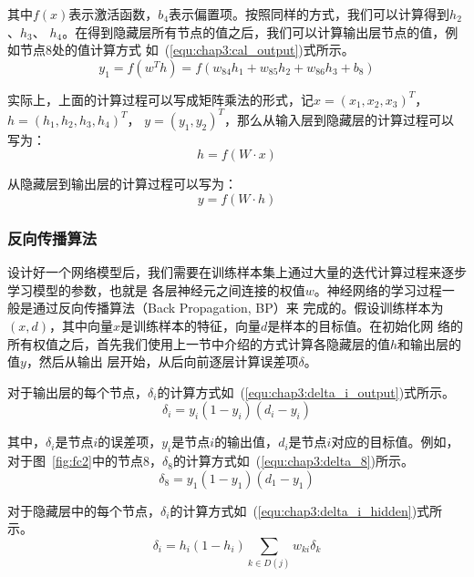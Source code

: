其中$f(x)$表示激活函数，$b_4$表示偏置项。按照同样的方式，我们可以计算得到$h_2$、$h_3$、
$h_4$。在得到隐藏层所有节点的值之后，我们可以计算输出层节点的值，例如节点8处的值计算方式
如~(\ref{equ:chap3:cal_output})式所示。
\begin{equation}
  \label{equ:chap3:cal_output}
  y_1 = f(w^Th)=f(w_{84}h_1+w_{85}h_2+w_{86}h_3+b_8)
\end{equation}

实际上，上面的计算过程可以写成矩阵乘法的形式，记$x=(x_1,x_2,x_3)^T$，$h=(h_1,h_2,h_3,h_4)^T$，
$y=(y_1,y_2)^T$，那么从输入层到隐藏层的计算过程可以写为：
\begin{equation}
  \label{equ:chap3:matrix_cal_hidden}
  h = f(W\cdot x)
\end{equation}

从隐藏层到输出层的计算过程可以写为：
\begin{equation}
  \label{equ:chap3:matrix_cal_output}
  y = f(W\cdot h)
\end{equation}

\subsubsection{反向传播算法}

设计好一个网络模型后，我们需要在训练样本集上通过大量的迭代计算过程来逐步学习模型的参数，也就是
各层神经元之间连接的权值$w$。神经网络的学习过程一般是通过反向传播算法（Back Propagation, BP）来
完成的。假设训练样本为$(x, d)$，其中向量$x$是训练样本的特征，向量$d$是样本的目标值。在初始化网
络的所有权值之后，首先我们使用上一节中介绍的方式计算各隐藏层的值$h$和输出层的值$y$，然后从输出
层开始，从后向前逐层计算误差项$\delta$。

对于输出层的每个节点，$\delta_i$的计算方式如~(\ref{equ:chap3:delta_i_output})式所示。
\begin{equation}
  \label{equ:chap3:delta_i_output}
  \delta_i = y_i(1-y_i)(d_i-y_i)
\end{equation}

其中，$\delta_i$是节点$i$的误差项，$y_i$是节点$i$的输出值，$d_i$是节点$i$对应的目标值。例如，
对于图~\ref{fig:fc2}中的节点8，$\delta_8$的计算方式如~(\ref{equ:chap3:delta_8})所示。
\begin{equation}
  \label{equ:chap3:delta_8}
  \delta_8 = y_1(1-y_1)(d_1-y_1)
\end{equation}

对于隐藏层中的每个节点，$\delta_i$的计算方式如~(\ref{equ:chap3:delta_i_hidden})式所示。
\begin{equation}
  \label{equ:chap3:delta_i_hidden}
  \delta_i=h_i(1-h_i)\sum_{k\in D(j)}w_{ki}\delta_k
\end{equation}

